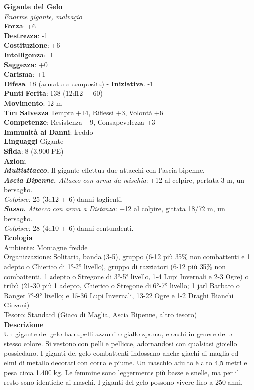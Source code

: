 \begin{multicols}{2}
\medskip\textbf{Gigante del Gelo}\\
\emph{Enorme gigante, malvagio}\\
\textbf{Forza}: +6\\
\textbf{Destrezza}: -1\\
\textbf{Costituzione}: +6\\
\textbf{Intelligenza}: -1\\
\textbf{Saggezza}: +0\\
\textbf{Carisma}: +1\\
\textbf{Difesa}: 18 (armatura composita) - \textbf{Iniziativa}: -1\\
\textbf{Punti Ferita}: 138 (12d12 + 60)\\
\textbf{Movimento}: 12 m\\
\textbf{Tiri Salvezza} Tempra +14, Riflessi +3, Volontà +6\\
\textbf{Competenze}: Resistenza +9, Consapevolezza +3\\
\textbf{Immunità ai Danni}: freddo\\
\textbf{Linguaggi} Gigante\\
\textbf{Sfida}: 8 (3.900 PE)\smallskip\\
\smallskip\textbf{Azioni}\\
\emph{\textbf{Multiattacco.}} Il gigante effettua due attacchi con l'ascia bipenne.\\
\emph{\textbf{Ascia Bipenne.} Attacco con arma da mischia}: +12 al colpire, portata 3 m, un bersaglio.\\
\emph{Colpisce:} 25 (3d12 + 6) danni taglienti.\\
\emph{\textbf{Sasso.} Attacco con arma a Distanza}: +12 al colpire, gittata 18/72 m, un bersaglio.\\
\emph{Colpisce:} 28 (4d10 + 6) danni contundenti.\\
\textbf{Ecologia}\\
Ambiente: Montagne fredde\\
Organizzazione: Solitario, banda (3-5), gruppo (6-12 più 35\% non combattenti e 1 adepto o Chierico di 1°-2° livello), gruppo di razziatori (6-12 più 35\% non combattenti, 1 adepto o Stregone di 3°-5° livello, 1-4 Lupi Invernali e 2-3 Ogre) o tribù (21-30 più 1 adepto, Chierico o Stregone di 6°-7° livello; 1 jarl Barbaro o Ranger 7°-9° livello; e 15-36 Lupi Invernali, 13-22 Ogre e 1-2 Draghi Bianchi Giovani)\\
Tesoro: Standard (Giaco di Maglia, Ascia Bipenne, altro tesoro)\\
\textbf{Descrizione}\\
Un gigante del gelo ha capelli azzurri o giallo sporco, e occhi in genere dello stesso colore. Si vestono con pelli e pellicce, adornandosi con qualsiasi gioiello possiedano. I giganti del gelo combattenti indossano anche giachi di maglia ed elmi di metallo decorati con corna e piume. Un maschio adulto è alto 4,5 metri e pesa circa 1.400 kg. Le femmine sono leggermente più basse e snelle, ma per il resto sono identiche ai maschi. I giganti del gelo possono vivere fino a 250 anni.\\


\end{multicols}
